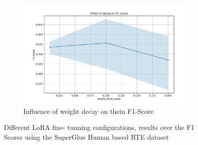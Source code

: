 \documentclass[fleqn,moreauthors,10pt]{ds_report}
\begin{document}
\begin{figure}[ht!]
\begin{subfigure}[b]{0.89\linewidth}
    \centering
    \includegraphics[width=\textwidth]{fig/weight_decay_on_F1_Score.pdf}
    \caption{Influence of weight decay on thein F1-Score}
    \label{fig:image3}
\end{subfigure}

\caption{Different LoRA fine- tunning configurations, results over the F1 Scores using the SuperGlue Human based RTE dataset}
\label{fig:lora_params}
\end{figure}
\end{document}
